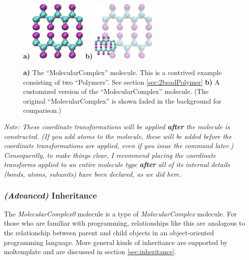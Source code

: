 \documentclass[11pt]{article}
\begin{document}
\begin{figure}[htbp]
\centering
\textbf{a)}
\includegraphics[height=3cm]{mol_complex_LR.jpg}
\hspace{1cm}
\textbf{b)}
\includegraphics[height=3cm]{mol_complex+mol_complex0_transparent_LR.jpg}
\caption{
\label{fig:mol_complex}
\textbf{a)}
The ``MolecularComplex'' molecule.  This is a contrived example consisting of
two ``Polymers''.  See section \ref{sec:2beadPolymer}
\textbf{b)}
A customized version of the ``MolecularComplex'' molecule.  
(The original ``MolecularComplex'' is shown faded in the background for comparison.)
}
\end{figure}

  

\textit{Note: These coordinate transformations will be 
applied \textbf{after} the molecule is constructed.
(If you add atoms to the molecule, these will be added before
the coordinate transformations are applied,
even if you issue the command later.)
Consequently, to make things clear, 
I recommend placing the coordinate transforms applied to 
an entire molecule type \textbf{after} all of its internal details 
(bonds, atoms, subunits) have been declared, as we did here.}

\subsubsection*{\textit{(Advanced)} Inheritance}
\label{sec:inheritance_intro}
The \textit{MolecularComplex0} molecule is a type of \textit{MolecularComplex} molecule.
For those who are familiar with programming, 
relationships like this are analogous to the relationship 
between parent and child objects in an object-oriented programming language.
More general kinds of inheritance are supported by moltemplate
and are discussed in section \ref{sec:inheritance}.
\end{document}
